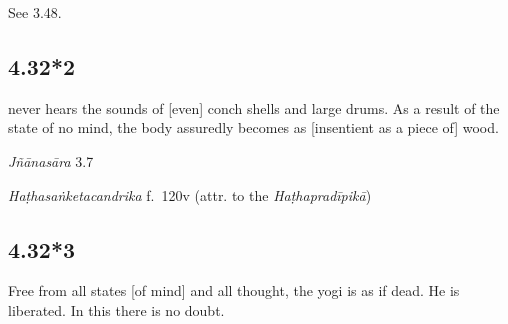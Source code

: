 \begin{ekdosis}
\begin{testimonia}[hp04_032_1]
\end{testimonia}

\begin{philcomm}[hp04_032_1]
See 3.48.
\end{philcomm}

\subsection*{4.32*2}
\begin{translation} never hears the sounds of [even] conch shells and large drums. As a result of the state of no mind, the body assuredly becomes as [insentient as a piece of] wood.
\end{translation}
%

\begin{sources}[hp04_032_2]
\emph{Jñānasāra} 3.7
\begin{versinnote}
\end{versinnote}
\end{sources}

\begin{testimonia}[hp04_032_2]
\emph{Haṭhasaṅketacandrika} f.~120v (attr. to the \emph{Haṭhapradīpikā})
\begin{versinnote}
\end{versinnote}

\end{testimonia}


\subsection*{4.32*3}
\begin{translation}[hp04_032_3]
Free from all states [of mind] and all thought, the yogi is as if dead. He is liberated. In this there is no doubt.
\end{translation}


\end{ekdosis}
